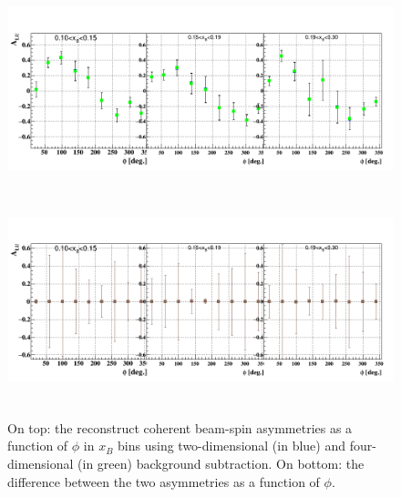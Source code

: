 \begin{figure}[tbp]
   \centering
    \includegraphics[height=6.0cm]{fig_rtpc/updates/BSA_Coherent_xB.png}
    \includegraphics[height=6.0cm]{fig_rtpc/updates/diff_BSA_Coherent_xB_2.png}
    \caption{On top: the reconstruct coherent beam-spin asymmetries as a 
    function of $\phi$ in $x_{B}$ bins using two-dimensional (in blue) and 
 four-dimensional (in green) background subtraction.  On bottom: the difference 
 between the two asymmetries as a function of $\phi$.}
    \label{fig:coh_binning}
    \end{figure}            


